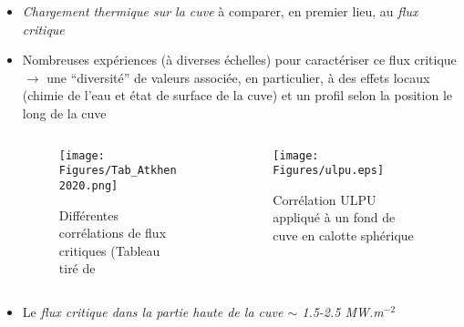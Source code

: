 \begin{frame}[fragile]
\begin{itemize}
\item \emph{Chargement thermique sur la cuve} à comparer, en premier lieu, au \emph{flux critique}
\item Nombreuses expériences (à diverses échelles) pour caractériser ce flux critique \\ $\rightarrow$ une ``diversité'' de valeurs associée, en particulier, à des effets locaux (chimie de l'eau et état de surface de la cuve) et un profil selon la position le long de la cuve
\begin{columns}
\begin{column}{0.75\textwidth}
\begin{figure}[H]
\centering \texttt{[image: Figures/Tab\_Atkhen2020.png]}
\caption{\tiny Différentes corrélations de flux critiques (Tableau tiré de \cite{Atkhen2020}}
\end{figure}
\end{column}
\begin{column}{0.25\textwidth}
\begin{figure}[H]
\centering \texttt{[image: Figures/ulpu.eps]}
\caption{\tiny Corrélation ULPU appliqué à un fond de cuve en calotte sphérique}
\end{figure}
\end{column}
\end{columns}
\item Le \emph{flux critique dans la partie haute de la cuve $\sim$ 1.5-2.5 MW.m$^{-2}$}
\end{itemize}
\end{frame}

